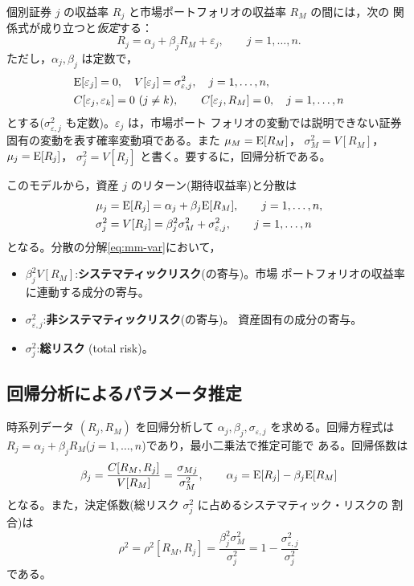 個別証券 $j$ の収益率 $R_j$ と市場ポートフォリオの収益率 $R_M$ の間には，次の
関係式が成り立つと\emph{仮定}する：
\begin{equation}
R_j = \alpha_j + \beta_j R_M + \varepsilon_j,\qquad j = 1,\dots,n.
\label{eq:market-model}
\end{equation}
ただし，$\alpha_j, \beta_j$ は定数で，
\begin{align*}
&\mathrm{E}[\varepsilon_j] = 0,\quad V[\varepsilon_j] = \sigma_{\varepsilon,j}^2,
\quad j=1,\dots,n,\\
&C[\varepsilon_j,\varepsilon_k] = 0\ (j\neq k),\qquad
C[\varepsilon_j, R_M] = 0,\quad j=1,\dots,n
\end{align*}
とする($\sigma_{\varepsilon,j}^2$ も定数)。$\varepsilon_j$ は，市場ポート
フォリオの変動では説明できない証券固有の変動を表す確率変動項である。また
$\mu_M = \mathrm{E}[R_M]$， $\sigma_M^2 = V[R_M]$， $\mu_j = \mathrm{E}[R_j]$，
$\sigma_j^2 = V[R_j]$ と書く。要するに，回帰分析である。

このモデルから，資産 $j$ のリターン(期待収益率)と分散は
\begin{align}
\mu_j &= \mathrm{E}[R_j] = \alpha_j + \beta_j \mathrm{E}[R_M],\qquad j=1,\dots,n,\\
\sigma_j^2 &= V[R_j] = \beta_j^2\sigma_M^2 + \sigma_{\varepsilon,j}^2,
\qquad j = 1,\dots,n
\label{eq:mm-var}
\end{align}
となる。分散の分解\eqref{eq:mm-var}において，
\begin{itemize}
\item $\beta_j^2 V[R_M]$:\textbf{システマティックリスク}(の寄与)。市場
ポートフォリオの収益率に連動する成分の寄与。
\item $\sigma_{\varepsilon,j}^2$:\textbf{非システマティックリスク}(の寄与)。
資産固有の成分の寄与。
\item $\sigma_j^2$:\textbf{総リスク} (total risk)。
\end{itemize}

\subsection{回帰分析によるパラメータ推定}

時系列データ $(R_j, R_M)$ を回帰分析して
$\alpha_j, \beta_j, \sigma_{\varepsilon,j}$ を求める。回帰方程式は
$R_j = \alpha_j + \beta_j R_M$($j=1,\dots,n$)であり，最小二乗法で推定可能で
ある。回帰係数は
\begin{equation}
\beta_j = \frac{C[R_M,R_j]}{V[R_M]} = \frac{\sigma_{Mj}}{\sigma_M^2},\qquad
\alpha_j = \mathrm{E}[R_j] - \beta_j\mathrm{E}[R_M]
\end{equation}
となる。また，決定係数(総リスク $\sigma_j^2$ に占めるシステマティック・リスクの
割合)は
\begin{equation}
\rho^2 = \rho^2[R_M,R_j]
= \frac{\beta_j^2\sigma_M^2}{\sigma_j^2}
= 1 - \frac{\sigma_{\varepsilon,j}^2}{\sigma_j^2}
\end{equation}
である。

